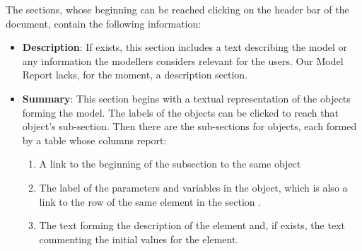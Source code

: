 \documentclass [11pt,a4paper] {book}
\begin{document}
The sections, whose beginning can be reached clicking on the header bar of the document,
contain the following information:
\begin{itemize}
  \item \textbf{Description}: If exists, this section includes a text describing the
  model or any information the modellers considers relevant for the users. Our Model
  Report lacks, for the moment, a description section.
  \item \textbf{Summary}: This section begins with a textual representation of the
  objects forming the model. The labels of the objects can be clicked to reach that
  object's sub-section. Then there are the sub-sections for objects, each formed by a table
  whose columns report:
  \begin{enumerate}
    \item A link to the beginning of the subsection to the same object
    \item The label of the parameters and variables in the object, which is also a link
    to the row of the same element in the section .
    \item The text forming the description of the element and, if exists, the text
    commenting the initial values for the element.
  \end{enumerate}


\end{itemize}
\end{document}
